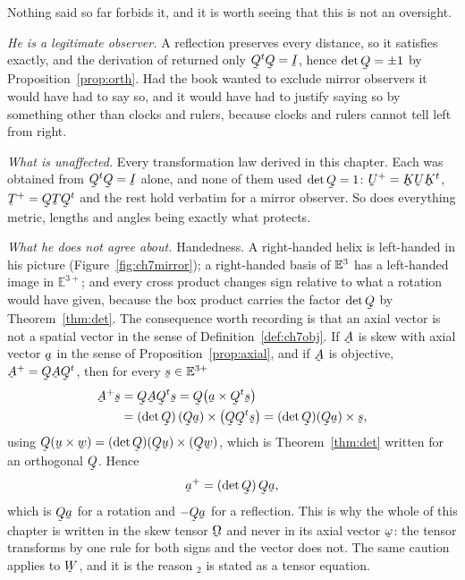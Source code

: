 \begin{remark}\label{rem:ch7mirror}
Nothing said so far forbids it, and it is worth seeing that this is not
an oversight.

\emph{He is a legitimate observer.} A reflection preserves every
distance, so it satisfies  exactly, and the derivation of
 returned only $\bQ^{t}\bQ=\I$, hence $\det\bQ=\pm1$ by
Proposition~\ref{prop:orth}. Had the book wanted to exclude mirror
observers it would have had to say so, and it would have had to justify
saying so by something other than clocks and rulers, because clocks and
rulers cannot tell left from right.

\emph{What is unaffected.} Every transformation law derived in this
chapter. Each was obtained from $\bQ^{t}\bQ=\I$ alone, and none of them
used $\det\bQ=1$: $\bU^{+}=\bK\bU\bK^{t}$, $\bT^{+}=\bQ\bT\bQ^{t}$ and
the rest hold verbatim for a mirror observer. So does everything metric,
lengths and angles being exactly what  protects.

\emph{What he does not agree about.} Handedness. A right-handed helix is
left-handed in his picture (Figure~\ref{fig:ch7mirror}); a right-handed
basis of $\mathbb{E}^{3}$ has a left-handed image in $\mathbb{E}^{3+}$; and every
cross product changes sign relative to what a rotation would have given,
because the box product carries the factor $\det\bQ$ by
Theorem~\ref{thm:det}. The consequence worth recording is that an axial
vector is not a spatial vector in the sense of
Definition~\ref{def:ch7obj}. If $\bA$ is skew with axial vector $\ba$ in
the sense of Proposition~\ref{prop:axial}, and if $\bA$ is objective,
$\bA^{+}=\bQ\bA\bQ^{t}$, then for every $\bs\in\mathbb{E}^{3+}$
\[
\begin{aligned}
   \bA^{+}\bs&=\bQ\bA\bQ^{t}\bs=\bQ\big(\ba\times\bQ^{t}\bs\big)\\
   &=(\det\bQ)\,(\bQ\ba)\times\big(\bQ\bQ^{t}\bs\big)
   =(\det\bQ)(\bQ\ba)\times\bs ,
\end{aligned}
\]
using $\bQ(\bu\times\bw)=(\det\bQ)(\bQ\bu)\times(\bQ\bw)$, which is
Theorem~\ref{thm:det} written for an orthogonal $\bQ$. Hence
\begin{equation*}
   \ba^{+}=(\det\bQ)\,\bQ\ba ,
\end{equation*}
which is $\bQ\ba$ for a rotation and $-\bQ\ba$ for a reflection. This is
why the whole of this chapter is written in the skew tensor $\bOm$ and
never in its axial vector $\bom$: the tensor transforms by one rule for
both signs and the vector does not. The same caution applies to $\bW$,
and it is the reason $_{2}$ is stated as a tensor equation.


\end{remark}
